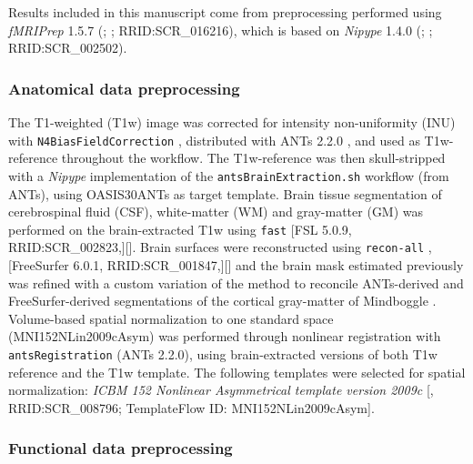 \documentclass[10pt,letterpaper]{article}
\begin{document}
Results included in this manuscript come from preprocessing performed
using \emph{fMRIPrep} 1.5.7 (\cite{fmriprep1}; \cite{fmriprep2}; RRID:SCR\_016216),
which is based on \emph{Nipype} 1.4.0
(\cite{nipype1}; \cite{nipype2}; RRID:SCR\_002502).


\subsubsection*{Anatomical data preprocessing}
\label{methods:anat}

The T1-weighted (T1w) image was corrected for intensity non-uniformity
(INU) with \texttt{N4BiasFieldCorrection} \cite{n4}, distributed with
ANTs 2.2.0 \cite[RRID:SCR\_004757]{ants}, and used as T1w-reference
throughout the workflow.
The T1w-reference was then skull-stripped with a \emph{Nipype} implementation
of the \texttt{antsBrainExtraction.sh} workflow (from ANTs), using OASIS30ANTs
as target template.
Brain tissue segmentation of cerebrospinal fluid (CSF), white-matter (WM) and
gray-matter (GM) was performed on the brain-extracted T1w using
\texttt{fast} \cite{fsl_fast} [FSL 5.0.9, RRID:SCR\_002823,][].
Brain surfaces were reconstructed using \texttt{recon-all} \cite{fs_reconall},
[FreeSurfer 6.0.1, RRID:SCR\_001847,][] and the brain mask estimated
previously was refined with a custom variation of the method to
reconcile ANTs-derived and FreeSurfer-derived segmentations of the
cortical gray-matter of Mindboggle \cite[RRID:SCR\_002438,]{mindboggle}.
Volume-based spatial normalization to one standard space (MNI152NLin2009cAsym)
was performed through nonlinear registration with \texttt{antsRegistration}
(ANTs 2.2.0), using brain-extracted versions of both T1w reference and the T1w template.
The following templates were selected for spatial normalization: \emph{ICBM 152 Nonlinear
Asymmetrical template version 2009c} {[}\cite{mni152nlin2009casym},
RRID:SCR\_008796; TemplateFlow ID: MNI152NLin2009cAsym{]}.

\subsubsection*{Functional data preprocessing}
\label{methods:func}
\end{document}
